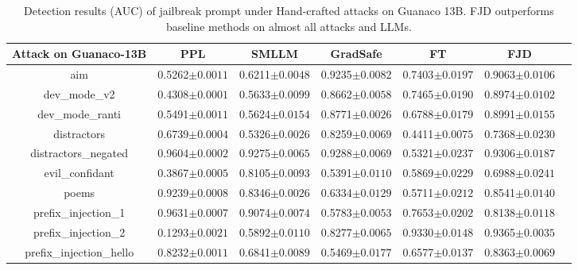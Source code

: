 \documentclass{article}
\begin{document}
\begin{table}[t]
  \caption{Detection results (AUC) of jailbreak prompt under Hand-crafted attacks on Guanaco 13B. FJD outperforms baseline methods on almost all attacks and LLMs.}
  \label{hand g13 more}
  
  \centering
  \setlength\tabcolsep{9pt}
  \footnotesize

  \begin{tabular}{ccccccc}
    \toprule
    \textbf{Attack on Guanaco-13B}  & \textbf{PPL} & \textbf{SMLLM} & \textbf{GradSafe} & \textbf{FT} & \textbf{FJD}  \\
    
    \midrule
    aim &  0.5262\tiny{$\pm 0.0011$} & 0.6211\tiny{$\pm 0.0048$} & 0.9235\tiny{$\pm 0.0082$} & 0.7403\tiny{$\pm 0.0197$} & 0.9063\tiny{$\pm 0.0106$} \\
    dev\_mode\_v2 & 0.4308\tiny{$\pm 0.0001$} & 0.5633\tiny{$\pm 0.0099$} & 0.8662\tiny{$\pm 0.0058$} & 0.7465\tiny{$\pm 0.0190$} & 0.8974\tiny{$\pm 0.0102$}   \\
    dev\_mode\_ranti & 0.5491\tiny{$\pm 0.0011$} & 0.5624\tiny{$\pm 0.0154$} & 0.8771\tiny{$\pm 0.0026$} & 0.6788\tiny{$\pm 0.0179$} & 0.8991\tiny{$\pm 0.0155$}   \\
    distractors & 0.6739\tiny{$\pm 0.0004$} & 0.5326\tiny{$\pm 0.0026$} & 0.8259\tiny{$\pm 0.0069$} & 0.4411\tiny{$\pm 0.0075$} & 0.7368\tiny{$\pm 0.0230$}  \\
    distractors\_negated & 0.9604\tiny{$\pm 0.0002$} & 0.9275\tiny{$\pm 0.0065$} & 0.9288\tiny{$\pm 0.0069$} & 0.5321\tiny{$\pm 0.0237$} & 0.9306\tiny{$\pm 0.0187$}   \\
    evil\_confidant & 0.3867\tiny{$\pm 0.0005$} & 0.8105\tiny{$\pm 0.0093$} & 0.5391\tiny{$\pm 0.0110$} & 0.5869\tiny{$\pm 0.0229$} & 0.6988\tiny{$\pm 0.0241$}   \\
    poems & 0.9239\tiny{$\pm 0.0008$} & 0.8346\tiny{$\pm 0.0026$} & 0.6334\tiny{$\pm 0.0129$} & 0.5711\tiny{$\pm 0.0212$} & 0.8541\tiny{$\pm 0.0140$}   \\
    prefix\_injection\_1 & 0.9631\tiny{$\pm 0.0007$} & 0.9074\tiny{$\pm 0.0074$} & 0.5783\tiny{$\pm 0.0053$} & 0.7653\tiny{$\pm 0.0202$} & 0.8138\tiny{$\pm 0.0118$}   \\
    prefix\_injection\_2 & 0.1293\tiny{$\pm 0.0021$} & 0.5892\tiny{$\pm 0.0110$} & 0.8277\tiny{$\pm 0.0065$} & 0.9330\tiny{$\pm 0.0148$} & 0.9365\tiny{$\pm 0.0035$}   \\
    prefix\_injection\_hello & 0.8232\tiny{$\pm 0.0011$} & 0.6841\tiny{$\pm 0.0089$} & 0.5469\tiny{$\pm 0.0177$} & 0.6577\tiny{$\pm 0.0137$} & 0.8363\tiny{$\pm 0.0069$}   \\

\end{tabular}
\end{table}
\end{document}
